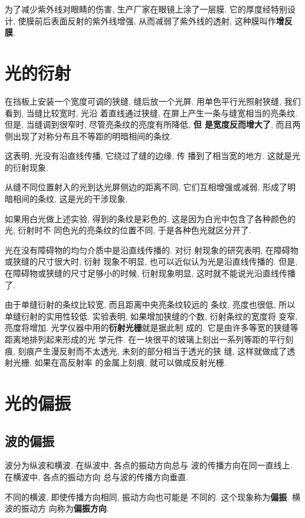 \documentclass[11pt,a4paper]{ctexbook}
\begin{document}
为了减少紫外线对眼睛的伤害, 生产厂家在眼镜上涂了一层膜. 它的厚度经特别设计,
使膜前后表面反射的紫外线增强, 从而减弱了紫外线的透射, 这种膜叫作\textbf{增反膜}.

\section{光的衍射}

在挡板上安装一个宽度可调的狭缝, 缝后放一个光屏.
用单色平行光照射狭缝, 我们看到, 当缝比较宽时, 光沿
着直线通过狭缝, 在屏上产生一条与缝宽相当的亮条纹.
但是, 当缝调到很窄时, 尽管亮条纹的亮度有所降低, \textbf{但
是宽度反而增大了}, 而且两侧出现了对称分布且不等距的明暗相间的条纹.

这表明, 光没有沿直线传播, 它绕过了缝的边缘, 传
播到了相当宽的地方. 这就是光的衍射现象.

从缝不同位置射入的光到达光屏侧边的距离不同, 它们互相增强或减弱,
形成了明暗相间的条纹, 这是光的干涉现象.

如果用白光做上述实验, 得到的条纹是彩色的.
这是因为白光中包含了各种颜色的光, 衍射时不
同色光的亮条纹的位置不同, 于是各种色光就区分开了.

光在没有障碍物的均匀介质中是沿直线传播的. 对衍
射现象的研究表明, 在障碍物或狭缝的尺寸很大时, 衍射
现象不明显, 也可以近似认为光是沿直线传播的. 但是,
在障碍物或狭缝的尺寸足够小的时候, 衍射现象明显,
这时就不能说光沿直线传播了.

由于单缝衍射的条纹比较宽, 而且距离中央亮条纹较远的
条纹, 亮度也很低, 所以单缝衍射的实用性较低.
实验表明, 如果增加狭缝的个数, 衍射条纹的宽度将
变窄, 亮度将增加. 光学仪器中用的\textbf{衍射光栅}就是据此制
成的. 它是由许多等宽的狭缝等距离地排列起来形成的光
学元件. 在一块很平的玻璃上刻出一系列等距的平行刻痕,
刻痕产生漫反射而不太透光, 未刻的部分相当于透光的狭
缝, 这样就做成了透射光栅. 如果在高反射率
的金属上刻痕, 就可以做成反射光栅.

\section{光的偏振}

\subsection{波的偏振}
波分为纵波和横波. 在纵波中, 各点的振动方向总与
波的传播方向在同一直线上. 在横波中, 各点的振动方向
总与波的传播方向垂直.

不同的横波, 即使传播方向相同, 振动方向也可能是
不同的. 这个现象称为\textbf{偏振}. 横波的振动方
向称为\textbf{偏振方向}.
\end{document}
